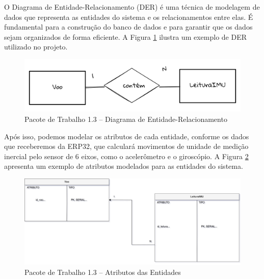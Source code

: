 \begin{samepage}

O Diagrama de Entidade-Relacionamento (DER) é uma técnica de modelagem de dados que representa as entidades do sistema e os relacionamentos entre elas. É fundamental para a construção do banco de dados e para garantir que os dados sejam organizados de forma eficiente. A Figura \ref{fig_der} ilustra um exemplo de DER utilizado no projeto.

\begin{figure}[!h]
	\centering
	\includegraphics[width=15cm]{figuras/der.png}
	\caption{Pacote de Trabalho 1.3 – Diagrama de Entidade-Relacionamento}
	\label{fig_der}
\end{figure}

Após isso, podemos modelar os atributos de cada entidade, conforme os dados que receberemos da ERP32, que calculará movimentos de unidade de medição inercial pelo sensor de 6 eixos, como o acelerômetro e o giroscópio. A Figura \ref{fig_atributos} apresenta um exemplo de atributos modelados para as entidades do sistema.

\begin{figure}[!h]
	\centering
	\includegraphics[width=15cm]{figuras/atributos.png}
	\caption{Pacote de Trabalho 1.3 – Atributos das Entidades}
	\label{fig_atributos}
\end{figure}

\end{samepage}


